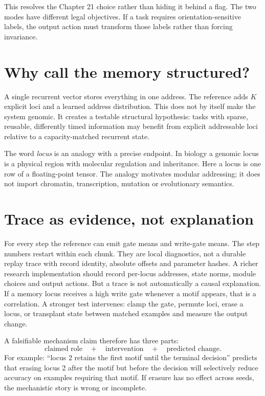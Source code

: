 This resolves the Chapter 21 choice rather than hiding it behind a flag. The two modes
have different legal objectives. If a task requires orientation-sensitive labels,
the output action must transform those labels rather than forcing invariance.

\section{Why call the memory structured?}

A single recurrent vector stores everything in one address. The reference adds
$K$ explicit loci and a learned address distribution. This does not by itself make
the system genomic. It creates a testable structural hypothesis: tasks with sparse,
reusable, differently timed information may benefit from explicit addressable loci
relative to a capacity-matched recurrent state.


The word \emph{locus} is an analogy with a precise endpoint. In biology a genomic
locus is a physical region with molecular regulation and inheritance. Here a locus
is one row of a floating-point tensor. The analogy motivates modular addressing;
it does not import chromatin, transcription, mutation or evolutionary semantics.

\section{Trace as evidence, not explanation}

For every step the reference can emit gate means and write-gate means.
The step numbers restart within each chunk. They are local diagnostics, not
a durable replay trace with record identity, absolute offsets and parameter hashes.
A richer
research implementation should record per-locus addresses, state norms, module
choices and output actions. But a trace is not automatically a causal explanation.
If a memory locus receives a high write gate whenever a motif appears, that is a
correlation. A stronger test intervenes: clamp the gate, permute loci, erase a locus,
or transplant state between matched examples and measure the output change.

A falsifiable mechanism claim therefore has three parts:
\[
\text{claimed role}\quad+\quad\text{intervention}\quad+\quad
\text{predicted change}.
\]
For example: ``locus 2 retains the first motif until the terminal decision'' predicts
that erasing locus 2 after the motif but before the decision will selectively reduce
accuracy on examples requiring that motif. If erasure has no effect across seeds,
the mechanistic story is wrong or incomplete.

